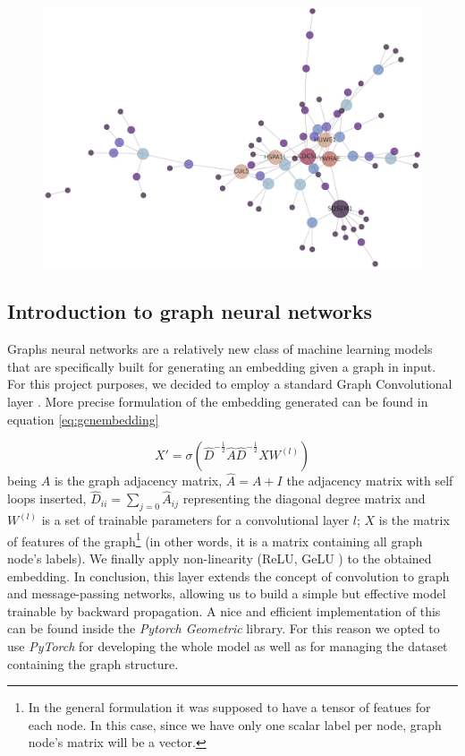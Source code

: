 \documentclass{article}
\begin{document}
\begin{multicols}{2}
\begin{figure}[!b]
    \centering
    \includegraphics[width=0.6\linewidth]{assets/graph_12345.png} 
    \label{fig:graph}
\end{figure}

\subsection{Introduction to graph neural networks}
Graphs neural networks are a relatively new class of machine learning models that are specifically built for generating an embedding given a graph in input. For this project purposes, we decided to employ a standard Graph Convolutional layer \cite{gcnconv}. More precise formulation of the embedding generated can be found in equation \ref{eq:gcnembedding}

\begin{equation}
X' = \sigma(\hat{D}^{-\frac{1}{2}}\hat{A}\hat{D}^{-\frac{1}{2}}XW^{(l)})
\label{eq:gcnembedding}
\end{equation}
\noindent
being $A$ is the graph adjacency matrix, $\hat{A} = A + I$ the adjacency matrix with self loops inserted, $\hat{D}_{ii} = \sum_{j=0}{\hat{A}_{ij}}$ representing the diagonal degree matrix and $W^{(l)}$ is a set of trainable parameters for a convolutional layer $l$; $X$ is the matrix of features of the graph\footnote{In the general formulation it was supposed to have a tensor of featues for each node. In this case, since we have only one scalar label per node, graph node's matrix will be a vector. } (in other words, it is a matrix containing all graph node's labels). We finally apply non-linearity (ReLU, GeLU \cite{hendrycks2020gaussian}) to the obtained embedding. In conclusion, this layer extends the concept of convolution to graph and message-passing \cite{Bacciu_2020} networks, allowing us to build a simple but effective model trainable by backward propagation. A nice and efficient implementation of this can be found inside the \textit{Pytorch Geometric} \cite{Fey/Lenssen/2019} library. For this reason we opted to use \textit{PyTorch} \cite{NEURIPS2019_9015} for developing the whole model as well as for managing the dataset containing the graph structure.


\end{multicols}
\end{document}
